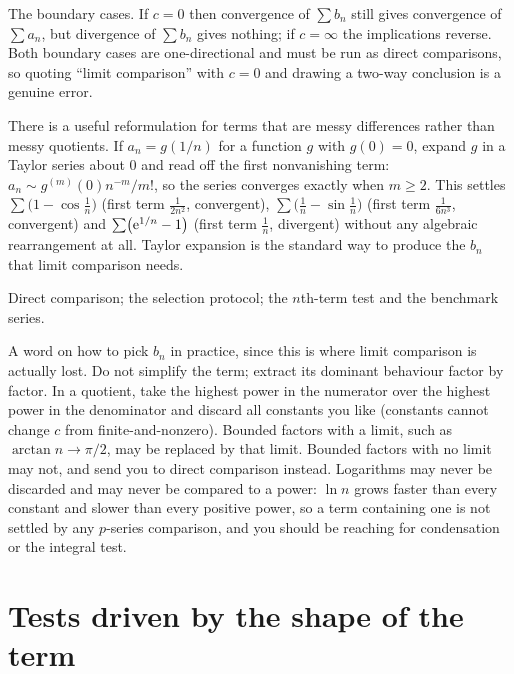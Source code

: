 \begin{trap}
The boundary cases. If $c=0$ then convergence of $\sum b_n$ still gives convergence of $\sum a_n$, but divergence of $\sum b_n$ gives nothing; if $c=\infty$ the implications reverse. Both boundary cases are one-directional and must be run as direct comparisons, so quoting ``limit comparison'' with $c=0$ and drawing a two-way conclusion is a genuine error.
\end{trap}

There is a useful reformulation for terms that are messy differences rather than messy quotients. If $a_n=g(1/n)$ for a function $g$ with $g(0)=0$, expand $g$ in a Taylor series about $0$ and read off the first nonvanishing term: $a_n\sim g^{(m)}(0)n^{-m}/m!$, so the series converges exactly when $m\geq2$. This settles $\sum\bigl(1-\cos\tfrac1n\bigr)$ (first term $\tfrac{1}{2n^2}$, convergent), $\sum\bigl(\tfrac1n-\sin\tfrac1n\bigr)$ (first term $\tfrac{1}{6n^3}$, convergent) and $\sum\bigl(\mathrm{e}^{1/n}-1\bigr)$ (first term $\tfrac1n$, divergent) without any algebraic rearrangement at all. Taylor expansion is the standard way to produce the $b_n$ that limit comparison needs.

\begin{seealsob}Direct comparison; the selection protocol; the $n$th-term test and the benchmark series.\end{seealsob}

A word on how to pick $b_n$ in practice, since this is where limit comparison is actually lost. Do not simplify the term; extract its dominant behaviour factor by factor. In a quotient, take the highest power in the numerator over the highest power in the denominator and discard all constants you like (constants cannot change $c$ from finite-and-nonzero). Bounded factors with a limit, such as $\arctan n\to\pi/2$, may be replaced by that limit. Bounded factors with no limit may not, and send you to direct comparison instead. Logarithms may never be discarded and may never be compared to a power: $\ln n$ grows faster than every constant and slower than every positive power, so a term containing one is not settled by any $p$-series comparison, and you should be reaching for condensation or the integral test.

\section{Tests driven by the shape of the term}

